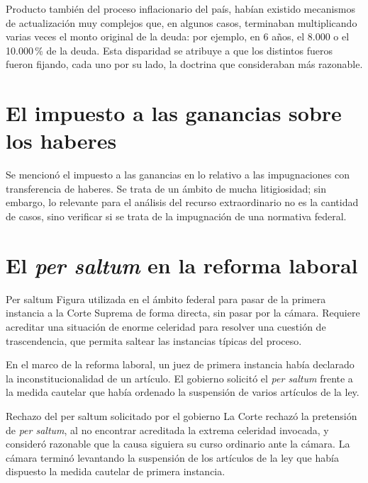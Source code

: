 \documentclass[12pt,oneside]{book}
\begin{document}
Producto también del proceso inflacionario del país, habían existido mecanismos de actualización muy complejos que, en algunos casos, terminaban multiplicando varias veces el monto original de la deuda: por ejemplo, en 6 años, el 8.000 o el 10.000\,\% de la deuda. Esta disparidad se atribuye a que los distintos fueros fueron fijando, cada uno por su lado, la doctrina que consideraban más razonable.

\section{El impuesto a las ganancias sobre los haberes}

Se mencionó el impuesto a las ganancias en lo relativo a las impugnaciones con transferencia de haberes. %
Se trata de un ámbito de mucha litigiosidad; sin embargo, lo relevante para el análisis del recurso extraordinario no es la cantidad de casos, sino verificar si se trata de la impugnación de una normativa federal.

\section{El \textit{per saltum} en la reforma laboral}

\begin{definition}{Per saltum}
Figura utilizada en el ámbito federal para pasar de la primera instancia a la Corte Suprema de forma directa, sin pasar por la cámara. Requiere acreditar una situación de enorme celeridad para resolver una cuestión de trascendencia, que permita saltear las instancias típicas del proceso.
\end{definition}

En el marco de la reforma laboral, un juez de primera instancia había declarado la inconstitucionalidad de un artículo. El gobierno solicitó el \textit{per saltum} frente a la medida cautelar que había ordenado la suspensión de varios artículos de la ley.

\begin{example}{Rechazo del per saltum solicitado por el gobierno}
La Corte rechazó la pretensión de \textit{per saltum}, al no encontrar acreditada la extrema celeridad invocada, y consideró razonable que la causa siguiera su curso ordinario ante la cámara. La cámara terminó levantando la suspensión de los artículos de la ley que había dispuesto la medida cautelar de primera instancia.
\end{example}
\end{document}
